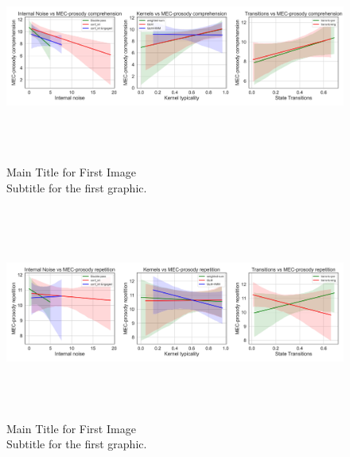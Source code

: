 \begin{figure}[H]
    \centering
    \includegraphics[width=17cm,height=7cm]{MainLayout/Images/chapter8/regression_results_mec_c.jpg}
    \caption{Main Title for First Image \\ \small Subtitle for the first graphic.}
    \label{fig:regression_results_mec_c}
\end{figure}

\begin{figure}[H]
    \centering
    \includegraphics[width=17cm,height=7cm]{MainLayout/Images/chapter8/regression_results_mec_r.jpg}
    \caption{Main Title for First Image \\ \small Subtitle for the first graphic.}
    \label{fig:regression_results_mec_r}
\end{figure}

